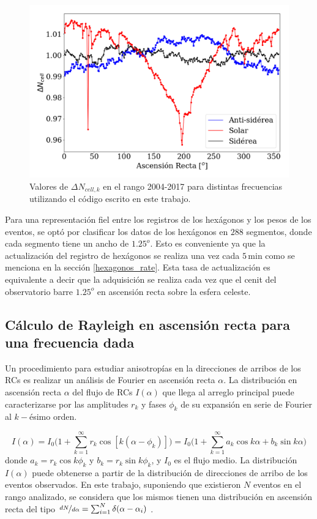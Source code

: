        \begin{figure}[H]
          \centering
              \includegraphics[width=0.75\linewidth]{weigths_2020.png}
              \caption{Valores de $\Delta N_{cell, k}$ en el rango 2004-2017 para distintas frecuencias utilizando el código escrito en este trabajo.}
              \label{fig:pesos_ejemplo}
        \end{figure}

    Para una representación fiel entre los registros de los hexágonos y los pesos de los eventos, se optó por clasificar los datos de los hexágonos en $288$ segmentos, donde cada segmento tiene un ancho de $1.25^o$. Esto es conveniente ya que la actualización del registro de hexágonos se realiza una vez  cada $5\,$min como se menciona en la sección \ref{hexagonos_rate}. Esta tasa de actualización es equivalente a decir que la adquisición se realiza cada vez que el cenit del observatorio barre  $1.25^o$ en ascensión recta sobre la esfera celeste.


  \subsection{Cálculo de Rayleigh en ascensión recta para una frecuencia dada} \label{rayleigh}

  Un procedimiento para estudiar anisotropías en la direcciones de arribos de los RCs es realizar un análisis de Fourier en ascensión recta $\alpha$. La distribución en ascensión recta $\alpha$ del flujo de RCs $I(\alpha)$ que llega al arreglo principal puede caracterizarse por las amplitudes $r_k$ y fases $\phi_k$ de su expansión en serie de Fourier al $k-$ésimo orden. 

  \begin{equation}
    I(\alpha) = I_0 \bigg ( 1+ \sum^\infty_{k=1} r_k\cos{[k(\alpha - \phi_k)]} \bigg) = I_0 \bigg ( 1+ \sum^\infty_{k=1} a_k\cos{k\alpha} +  b_k\sin{k\alpha} \bigg ) 
  \end{equation}
  donde $a_k=r_k\cos k\phi_k$ y $b_k=r_k\sin k \phi_k$, y $I_0$ es el flujo medio. La distribución $I(\alpha)$ puede obtenerse a partir de la distribución de direcciones de arribo de los eventos observados.  En este trabajo, suponiendo que existieron $N$ eventos en el rango analizado, se considera que los mismos tienen una distribución en ascensión recta del tipo $\nicefrac{dN}{d\alpha}= \sum^N_{i=1} \delta(\alpha - \alpha_i)$ \cite{taborda}. 

